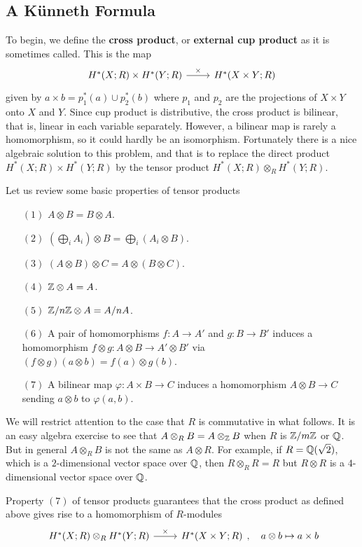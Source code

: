 \subsection{A K\"unneth Formula}
To begin, we define the \textbf{cross product}, or \textbf{external cup product} as it is sometimes called. This is the map
\[\begin{tikzcd}
H^*(X;R)\times H^*(Y;R)\ar[r,"\times"]&H^*(X\times Y;R)
\end{tikzcd}\]
given by $a\times b=p_1^*(a)\cup p^*_2(b)$ where $p_1$ and $p_2$ are the projections of $X\times Y$ onto $X$ and $Y$. Since cup product is distributive, the cross product is bilinear, that is, linear in each variable separately. However, a bilinear map is rarely a homomorphism, so it could hardly be an isomorphism. Fortunately there is a nice algebraic solution to this problem, and that is to replace the direct product $H^*(X;R)\times H^*(Y;R)$ by the tensor product $H^*(X;R)\otimes_R H^*(Y;R)$.\par
Let us review some basic properties of tensor products
\begin{itemize}
\item[$(1)$]$A\otimes B=B\otimes A$.
\item[$(2)$]$(\bigoplus_iA_i)\otimes B=\bigoplus_i(A_i\otimes B)$.
\item[$(3)$]$(A\otimes B)\otimes C=A\otimes(B\otimes C)$.
\item[$(4)$]$\mathbb{Z}\otimes A=A$.
\item[$(5)$]$\mathbb{Z}/n\mathbb{Z}\otimes A=A/nA$.
\item[$(6)$]A pair of homomorphisms $f:A\to A'$ and $g:B\to B'$ induces a homomorphism $f\otimes g:A\otimes B\to A'\otimes B'$ via $(f\otimes g)(a\otimes b)=f(a)\otimes g(b)$.
\item[$(7)$]A bilinear map $\varphi:A\times B\to C$ induces a homomorphism $A\otimes B\to C$ sending $a\otimes b$ to $\varphi(a,b)$.
\end{itemize}
We will restrict attention to the case that $R$ is commutative in what follows. It is an easy algebra exercise to see that $A\otimes_RB=A\otimes_{\mathbb{Z}} B$ when $R$ is $\mathbb{Z}/m\mathbb{Z}$ or $\mathbb{Q}$. But in general $A\otimes_RB$ is not the same as $A\otimes R$. For example, if $R=\mathbb{Q}(\sqrt{2})$, which is a $2$-dimensional vector space over $\mathbb{Q}$, then $R\otimes_RR=R$ but $R\otimes R$ is a $4$-dimensional vector space over $\mathbb{Q}$.\par
Property $(7)$ of tensor products guarantees that the cross product as defined above gives rise to a homomorphism of $R$-modules
\[\begin{tikzcd}
H^*(X;R)\otimes_RH^*(Y;R)\ar[r,"\times"]&H^*(X\times Y;R)
\end{tikzcd},\quad a\otimes b\mapsto a\times b\]
